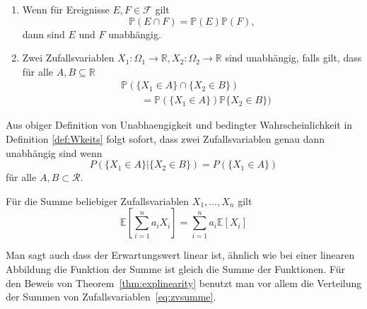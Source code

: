 \begin{Def}

\begin{enumerate}
	\item Wenn f\"ur Ereignisse $E, F \in \mathcal{F} $ gilt
	\begin{equation} 
	\mathbb{P} (E\cap F)= \mathbb{P} (E)  \mathbb{P} (F),
	\end{equation}
        dann sind $E$ und $F$ unabhängig. 
\item Zwei Zufallsvariablen $X_1 : \Omega_1 \to \mathbb{R}, X_2:\Omega_2 \to \mathbb{R}$
sind unabhängig, falls gilt, dass für alle $A, B \subseteq \mathbb{R}$
\begin{align*}
&\mathbb{P} (\{X_{1} \in A\} \cap \{X_{2} \in B\} )\\ &\qquad= \mathbb{P} (\{X_{1} \in A\})  \mathbb{P} \{X_{2} \in B\} )
\end{align*}
\end{enumerate}

Aus obiger Definition von Unabhaengigkeit und bedingter Wahrscheinlichkeit in Definition \ref{def:Wkeits} folgt sofort, dass zwei Zufallsvariablen  genau dann unabh\"angig sind wenn
\begin{equation*}
P(\{X_1 \in A\} | \{X_2 \in B\}) = P(\{X_1\in A\})
\end{equation*}
f\"ur alle $A,B \subset \mathcal{R}$. 

\end{Def}


\begin{Thm}
\label{thm:explinearity}
Für die Summe beliebiger Zufallsvariablen $X_{1}, \dots, X_{n}$ gilt
\begin{equation*}
\mathbb{E} \left[\sum_{i=1}^{n} a_{i} X_{i}\right] = \sum_{i=1}^{n} a_{i} \mathbb{E} [X_{i}] 
\end{equation*}
\end{Thm}

Man sagt auch dass der Erwartungswert linear ist, \"ahnlich wie bei einer linearen Abbildung die Funktion der Summe ist gleich die Summe der Funktionen. F\"ur den Beweis von Theorem~\ref{thm:explinearity} benutzt man vor allem die Verteilung der Summen von Zufallsvariablen~\eqref{eq:zvsumme}.

